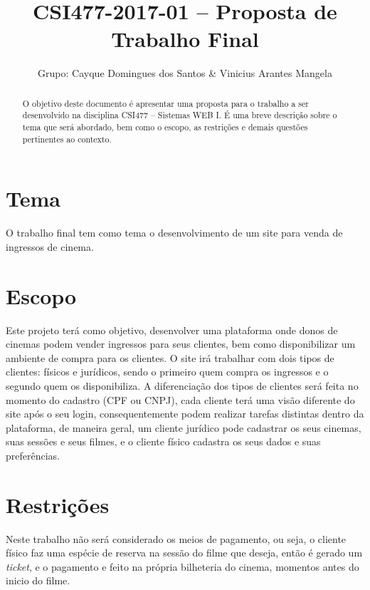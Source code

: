 \documentclass[10pt,a4paper,article]{abntex2}
\title{CSI477-2017-01 -- Proposta de Trabalho Final}
\author{Grupo: Cayque Domingues dos Santos \& Vinicius Arantes Mangela}
\begin{document}
	\maketitle

	\begin{abstract}
		O objetivo deste documento é apresentar uma proposta para o trabalho a ser desenvolvido na disciplina CSI477 -- Sistemas WEB I. É uma breve descrição sobre o tema que será abordado, bem como o escopo, as restrições e demais questões pertinentes ao contexto.
	\end{abstract}

	\section{Tema}

		O trabalho final tem como tema o desenvolvimento de um site para venda de ingressos de cinema.

	\section{Escopo}

		Este projeto terá como objetivo, desenvolver uma plataforma onde donos de cinemas podem vender ingressos para seus clientes, bem como disponibilizar um ambiente de compra para os clientes. O site irá trabalhar com dois tipos de clientes: físicos e jurídicos, sendo o primeiro quem compra os ingressos e o segundo quem os disponibiliza. A diferenciação dos tipos de clientes será feita no momento do cadastro (CPF ou CNPJ), cada cliente terá uma visão diferente do site após o seu login, consequentemente podem realizar tarefas distintas dentro da plataforma, de maneira geral, um cliente jurídico pode cadastrar os seus cinemas, suas sessões e seus filmes, e o cliente físico cadastra os seus dados e suas preferências. 

	\section{Restrições}

		Neste trabalho não será considerado os meios de pagamento, ou seja, o cliente físico faz uma espécie de reserva na sessão do filme que deseja, então é gerado um \textit{ticket}, e o pagamento e feito na própria bilheteria do cinema, momentos antes do inicio do filme.
\end{document}

